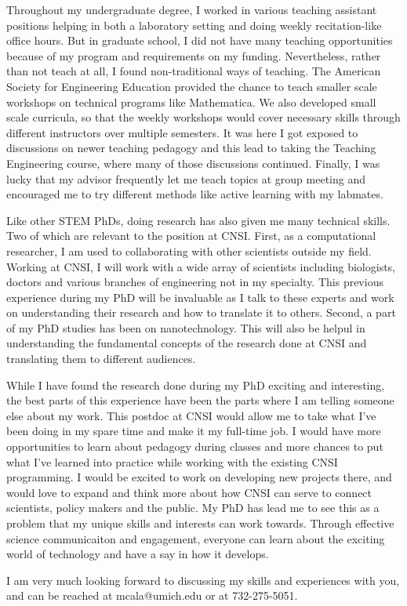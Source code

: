 Throughout my undergraduate degree, I worked in various teaching assistant positions helping in both a laboratory setting and doing weekly recitation-like office hours. But in graduate school, I did not have many teaching opportunities because of my program and requirements on my funding. Nevertheless, rather than not teach at all, I found non-traditional ways of teaching. The American Society for Engineering Education provided the chance to teach smaller scale workshops on technical programs like Mathematica. We also developed small scale curricula, so that the weekly workshops would cover necessary skills through different instructors over multiple semesters. It was here I got exposed to discussions on newer teaching pedagogy and this lead to taking the Teaching Engineering course, where many of those discussions continued. Finally, I was lucky that my advisor frequently let me teach topics at group meeting and encouraged me to try different methods like active learning with my labmates.

Like other STEM PhDs, doing research has also given me many technical skills. Two of which are relevant to the position at CNSI. First, as a computational researcher, I am used to collaborating with other scientists outside my field. Working at CNSI, I will work with a wide array of scientists including biologists, doctors and various branches of engineering not in my specialty. This previous experience during my PhD will be invaluable as I talk to these experts and work on understanding their research and how to translate it to others. Second, a part of my PhD studies has been on nanotechnology. This will also be helpul in understanding the fundamental concepts of the research done at CNSI and translating them to different audiences.


While I have found the research done during my PhD exciting and interesting, the best parts of this experience have been the parts where I am telling someone else about my work. This postdoc at CNSI would allow me to take what I've been doing in my spare time and make it my full-time job. I would have more opportunities to learn about pedagogy during classes and more chances to put what I've learned into practice while working with the existing CNSI programming. I would be excited to work on developing new projects there, and would love to expand and think more about how CNSI can serve to connect scientists, policy makers and the public. My PhD has lead me to see this as a problem that my unique skills and interests can work towards. Through effective science communicaiton and engagement, everyone can learn about the exciting world of technology and have a say in how it develops.
\thispagestyle{empty}

I am very much looking forward to discussing my skills and experiences with you, and can be reached at mcala@umich.edu or at 732-275-5051.

\makeletterclosing
